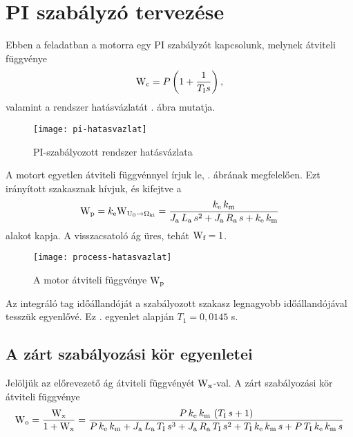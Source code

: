 \section{PI szabályzó tervezése}


Ebben a feladatban a motorra egy PI szabályzót kapcsolunk, melynek átviteli függvénye
\begin{equation}
	\mathrm{W}_\text{c} = P\left(1+\frac{1}{T_\text{I}s}\right),
\end{equation}
valamint a rendszer hatásvázlatát . ábra mutatja.

\begin{figure}[H]
	\centering
	\texttt{[image: pi-hatasvazlat]}
	\caption{PI-szabályozott rendszer hatásvázlata}
	\label{fig:pi-hatasvazlat}
\end{figure}

A motort egyetlen átviteli függvénnyel írjuk le, 
. ábrának megfelelően.
Ezt irányított szakasznak hívjuk, és kifejtve a
\begin{equation}
	\mathrm{W}_\text{p} = k_\text{e}\mathrm{W}_{\mathrm{U}_0\rightarrow\Omega_\text{ki}} =
	\frac{k_\text{e}\, k_\text{m}}{J_\text{a}\, L_\text{a}\, s^2 + J_\text{a}\, R_\text{a}\, s + k_\text{e}\, k_\text{m}}
\end{equation}
alakot kapja.
A visszacsatoló ág üres, tehát $\mathrm{W}_\text{f} = 1$.

\begin{figure}[H]
	\centering
	\texttt{[image: process-hatasvazlat]}
	\caption{A motor átviteli függvénye $\mathrm{W}_\text{p}$}
	\label{fig:process-hatasvazlat}
\end{figure}

Az integráló tag időállandóját a szabályozott szakasz legnagyobb időállandójával
tesszük egyenlővé. Ez . egyenlet alapján $T_1 = 0,0145$ s.


\subsection{A zárt szabályozási kör egyenletei}

Jelöljük az előrevezető ág átviteli függvényét $\mathrm{W}_\text{x}$-val.
A zárt szabályozási kör átviteli függvénye
\begin{equation}\label{eq:W-x}
	\mathrm{W}_\text{o} = \frac{\mathrm{W}_\text{x}}{1 + \mathrm{W}_\text{x}} =
	\frac{P\, k_\text{e}\, k_\text{m}\, \left(T_\text{I}\, s + 1\right)}{P\, k_\text{e}\, k_\text{m} + J_\text{a}\, L_\text{a}\, T_\text{I}\, s^3 + J_\text{a}\, R_\text{a}\, T_\text{I}\, s^2 + T_\text{I}\, k_\text{e}\, k_\text{m}\, s + P\, T_\text{I}\, k_\text{e}\, k_\text{m}\, s}
\end{equation}

